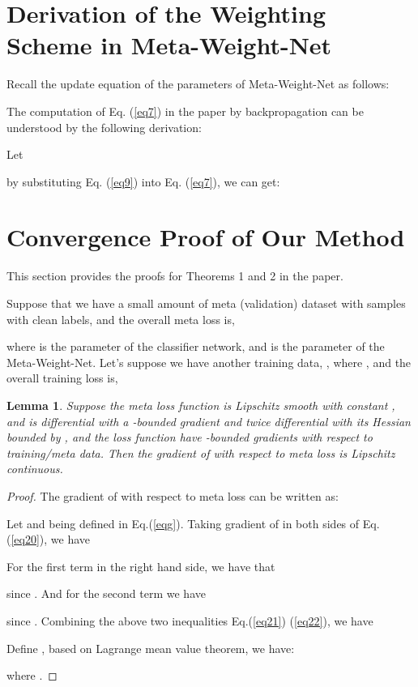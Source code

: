 \documentclass{article}
\newtheorem{lemma}{Lemma}
\begin{document}
	
	
	\section{Derivation of the Weighting Scheme in Meta-Weight-Net}
	Recall the update equation of the parameters of Meta-Weight-Net as follows:
	
	The computation of Eq. (\ref{eq7}) in the paper by backpropagation can be understood by the following derivation:
	
	Let 
	 
	by substituting Eq. (\ref{eq9}) into Eq. (\ref{eq7}), we can get:
	
	
	
	
	
	\section{Convergence Proof of Our Method}
	This section provides the proofs for Theorems 1 and 2 in the paper.
	


	Suppose that we have a small amount of meta (validation) dataset with  samples  with clean labels, and the overall meta loss is,
	
	where  is the parameter of the classifier network, and  is the parameter of the Meta-Weight-Net. Let's suppose we have another  training data, , where , and the overall training loss is,
	
	
	
	\begin{lemma}\label{lemma1}
		Suppose the meta loss function is Lipschitz smooth with constant , and  is differential with a -bounded gradient and twice differential with its Hessian bounded by , and the loss function  have -bounded gradients with respect to training/meta data. Then the gradient of  with respect to meta loss is Lipschitz continuous.
	\end{lemma}
	\begin{proof}
		The gradient of  with respect to meta loss can be written as:
		
		
		Let   \footnotesize and  being defined in Eq.(\ref{eqg}). Taking gradient of  in both sides of Eq.(\ref{eq20}), we have
		
		For the first term in the right hand side, we have that
		
		since . And for the second term we have
		
		since . Combining the above two inequalities Eq.(\ref{eq21}) (\ref{eq22}), we have
		 
		Define , based on Lagrange mean value theorem, we have:
		
		where .
	\end{proof}
	
\end{document}
